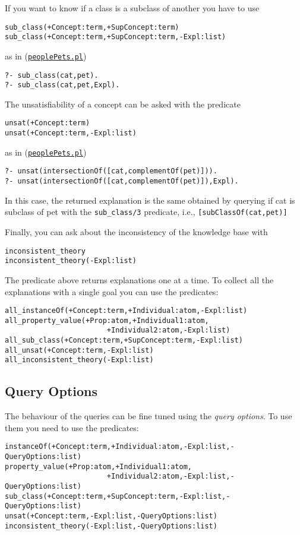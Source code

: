 If you want to know if a class is a subclass of another you have to use
\begin{verbatim}
sub_class(+Concept:term,+SupConcept:term)
sub_class(+Concept:term,+SupConcept:term,-Expl:list)
\end{verbatim}
as in (\href{http://trill-sw.eu/example/trill/peoplePets.pl}{\texttt{peoplePets.pl}})
\begin{verbatim}
?- sub_class(cat,pet).
?- sub_class(cat,pet,Expl).
\end{verbatim}

The unsatisfiability of a concept can be asked with the predicate
\begin{verbatim}
unsat(+Concept:term)
unsat(+Concept:term,-Expl:list)
\end{verbatim}
as in (\href{http://trill-sw.eu/example/trill/peoplePets.pl}{\texttt{peoplePets.pl}})
\begin{verbatim}
?- unsat(intersectionOf([cat,complementOf(pet)])).
?- unsat(intersectionOf([cat,complementOf(pet)]),Expl).
\end{verbatim}
In this case, the returned explanation is the same obtained by querying if cat is subclass of pet with the \verb|sub_class/3| predicate, i.e., \verb|[subClassOf(cat,pet)]|

Finally, you can ask about the inconsistency of the knowledge base with
\begin{verbatim}
inconsistent_theory
inconsistent_theory(-Expl:list)
\end{verbatim}

The predicate above returns explanations one at a time. To collect all the explanations with a single goal you can use the predicates:
\begin{verbatim}
all_instanceOf(+Concept:term,+Individual:atom,-Expl:list)
all_property_value(+Prop:atom,+Individual1:atom,
                        +Individual2:atom,-Expl:list)
all_sub_class(+Concept:term,+SupConcept:term,-Expl:list)
all_unsat(+Concept:term,-Expl:list)
all_inconsistent_theory(-Expl:list)
\end{verbatim}

\subsection{Query Options}
The behaviour of the queries can be fine tuned using the \emph{query options}. To use them you need to use the predicates:
\begin{verbatim}
instanceOf(+Concept:term,+Individual:atom,-Expl:list,-QueryOptions:list)
property_value(+Prop:atom,+Individual1:atom,
                        +Individual2:atom,-Expl:list,-QueryOptions:list)
sub_class(+Concept:term,+SupConcept:term,-Expl:list,-QueryOptions:list)
unsat(+Concept:term,-Expl:list,-QueryOptions:list)
inconsistent_theory(-Expl:list,-QueryOptions:list)
\end{verbatim}

